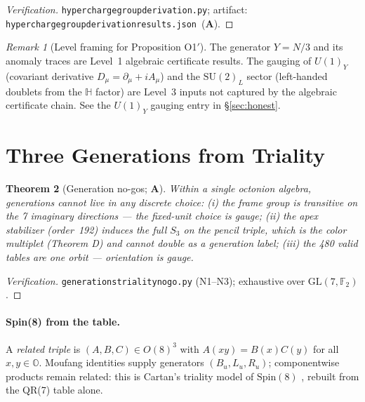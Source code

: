 \documentclass[11pt]{article}
\newtheorem{theorem}{Theorem}[section]
\theoremstyle{remark}
\newtheorem{remark}[theorem]{Remark}
\newcommand{\lean}[1]{%
  \penalty-100
  \begingroup\def\_{\textunderscore\allowbreak}\texttt{#1}\endgroup}
\newcommand{\CatA}{\textbf{A}}
\begin{document}
\begin{proof}[Verification]
\lean{hypercharge\_group\_derivation.py};
artifact: \lean{hypercharge\_group\_derivation\_results.json}~(\CatA).
\end{proof}

\begin{remark}[Level framing for Proposition O1$'$]
The generator $Y = N/3$ and its anomaly traces are Level~1 algebraic
certificate results. The gauging of $U(1)_Y$ (covariant derivative
$D_\mu = \partial_\mu + iA_\mu$) and the $\mathrm{SU}(2)_L$ sector (left-handed
doublets from the $\mathbb{H}$ factor) are Level~3 inputs not captured by the
algebraic certificate chain. See the $U(1)_Y$ gauging entry in \S\ref{sec:honest}.
\end{remark}

\section{Three Generations from Triality}
\label{sec:gen}

\begin{theorem}[Generation no-gos; \CatA]
\label{thm:G0}
Within a single octonion algebra, generations cannot live in any discrete
choice: (i) the frame group is transitive on the 7 imaginary directions ---
the fixed-unit choice is gauge; (ii) the apex stabilizer (order~192) induces
the full $S_3$ on the pencil triple, which is the color multiplet
(Theorem D) and cannot double as a generation label; (iii) the 480 valid tables
are one orbit --- orientation is gauge.
\end{theorem}

\begin{proof}[Verification]
\lean{generations\_triality\_nogo.py} (N1--N3); exhaustive over
$\mathrm{GL}(7,\mathbb{F}_2)$.
\end{proof}

\paragraph{Spin(8) from the table.}
A \emph{related triple} is $(A,B,C)\in O(8)^3$ with $A(xy) = B(x)C(y)$ for all
$x,y\in\mathbb{O}$.
Moufang identities supply generators $(B_u, L_u, R_u)$; componentwise products
remain related: this is Cartan's triality model of $\mathrm{Spin}(8)$
\cite{Cartan1925}, rebuilt from the QR(7) table alone.
\end{document}
